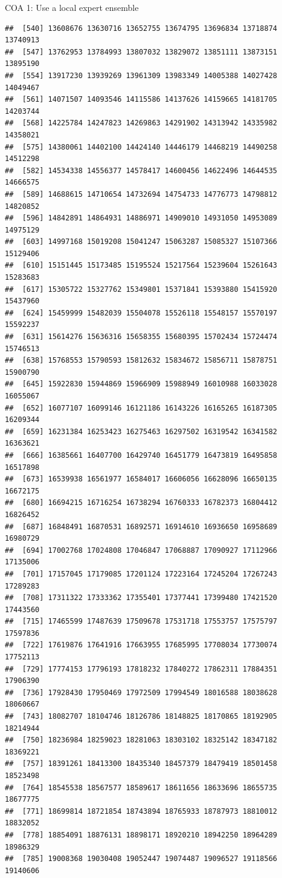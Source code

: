 \documentclass[ignorenonframetext,]{beamer}
\begin{document}
\begin{frame}[fragile]{COA 1: Use a local expert ensemble}
\begin{verbatim}
##  [540] 13608676 13630716 13652755 13674795 13696834 13718874 13740913
##  [547] 13762953 13784993 13807032 13829072 13851111 13873151 13895190
##  [554] 13917230 13939269 13961309 13983349 14005388 14027428 14049467
##  [561] 14071507 14093546 14115586 14137626 14159665 14181705 14203744
##  [568] 14225784 14247823 14269863 14291902 14313942 14335982 14358021
##  [575] 14380061 14402100 14424140 14446179 14468219 14490258 14512298
##  [582] 14534338 14556377 14578417 14600456 14622496 14644535 14666575
##  [589] 14688615 14710654 14732694 14754733 14776773 14798812 14820852
##  [596] 14842891 14864931 14886971 14909010 14931050 14953089 14975129
##  [603] 14997168 15019208 15041247 15063287 15085327 15107366 15129406
##  [610] 15151445 15173485 15195524 15217564 15239604 15261643 15283683
##  [617] 15305722 15327762 15349801 15371841 15393880 15415920 15437960
##  [624] 15459999 15482039 15504078 15526118 15548157 15570197 15592237
##  [631] 15614276 15636316 15658355 15680395 15702434 15724474 15746513
##  [638] 15768553 15790593 15812632 15834672 15856711 15878751 15900790
##  [645] 15922830 15944869 15966909 15988949 16010988 16033028 16055067
##  [652] 16077107 16099146 16121186 16143226 16165265 16187305 16209344
##  [659] 16231384 16253423 16275463 16297502 16319542 16341582 16363621
##  [666] 16385661 16407700 16429740 16451779 16473819 16495858 16517898
##  [673] 16539938 16561977 16584017 16606056 16628096 16650135 16672175
##  [680] 16694215 16716254 16738294 16760333 16782373 16804412 16826452
##  [687] 16848491 16870531 16892571 16914610 16936650 16958689 16980729
##  [694] 17002768 17024808 17046847 17068887 17090927 17112966 17135006
##  [701] 17157045 17179085 17201124 17223164 17245204 17267243 17289283
##  [708] 17311322 17333362 17355401 17377441 17399480 17421520 17443560
##  [715] 17465599 17487639 17509678 17531718 17553757 17575797 17597836
##  [722] 17619876 17641916 17663955 17685995 17708034 17730074 17752113
##  [729] 17774153 17796193 17818232 17840272 17862311 17884351 17906390
##  [736] 17928430 17950469 17972509 17994549 18016588 18038628 18060667
##  [743] 18082707 18104746 18126786 18148825 18170865 18192905 18214944
##  [750] 18236984 18259023 18281063 18303102 18325142 18347182 18369221
##  [757] 18391261 18413300 18435340 18457379 18479419 18501458 18523498
##  [764] 18545538 18567577 18589617 18611656 18633696 18655735 18677775
##  [771] 18699814 18721854 18743894 18765933 18787973 18810012 18832052
##  [778] 18854091 18876131 18898171 18920210 18942250 18964289 18986329
##  [785] 19008368 19030408 19052447 19074487 19096527 19118566 19140606

\end{verbatim}
\end{frame}
\end{document}
